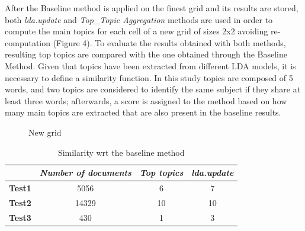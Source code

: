 After the Baseline method is applied on the finest grid and its results are stored, both \emph{lda.update} and \emph{Top\_Topic Aggregation} methods are used in order to compute the main topics for each cell of a new grid of sizes 2x2 avoiding re-computation (Figure 4). To evaluate the results obtained with both methods, resulting top topics are compared with the one obtained through the Baseline Method. Given that topics have been extracted from different LDA models, it is necessary to define a similarity function. In this study topics are composed of 5 words, and two topics are considered to identify the same subject if they share at least three words; afterwards, a score is assigned to the method based on how many main topics are extracted that are also present in the baseline results.\\

\begin{figure}[h]
	\caption{New grid}
\end{figure}


\begin{table}[h]
\centering
\caption{Similarity wrt the baseline method}
\label{tab1}
\begin{tabular}{@{}cccc@{}}
\toprule
\multicolumn{1}{l}{} & \multicolumn{1}{l}{\textit{\textbf{Number of documents}}} & \multicolumn{1}{l}{\textit{\textbf{Top topics}}} & \multicolumn{1}{l}{\textit{\textbf{lda.update}}} \\ \midrule
\textbf{Test1}       & 5056                                                     & 6                                                                
& 7                                                                \\
\textbf{Test2}       & 14329                                                      & 10                                                                & 10                                                                \\
\textbf{Test3}       & 430                                                    & 1                                                                     & 3                                                               \\ \bottomrule
\end{tabular}
\end{table}

